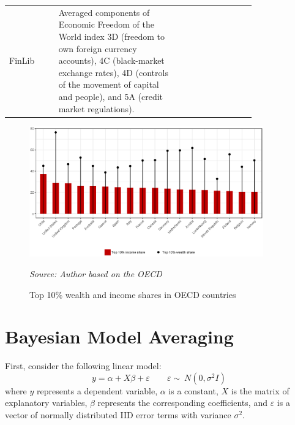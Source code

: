\begin{refsection}
\begin{subappendices}
\begin{center}
\begin{longtable}{l p{0.50\linewidth} p{0.3\linewidth}}
      FinLib & Averaged components of Economic Freedom of the World index 3D (freedom to own foreign currency accounts), 4C (black-market exchange rates), 4D (controls of the movement of capital and people), and 5A (credit market regulations). & \href{https://www.fraserinstitute.org/economic-freedom/dataset}{\textcite{gwartney2017}} \\
    
    \end{longtable}
    \end{center}
    
    \begin{figure}[ht!]
        \caption{Top 10\% wealth and income shares in \ac{OECD} countries}
        \centering
        \includegraphics[width=0.9\textwidth]{figures/ch3/wealthincome_comp_oecd.eps}
        \label{ch3fig:wealthincome_comp_oecd}
        \begin{minipage}{0.8\textwidth}
          \footnotesize
          \emph{Source: Author based on the \ac{OECD}}
          \end{minipage}
    \end{figure}
    
    \newpage
    \section{Bayesian Model Averaging}
    \label{ch3sec:app_bma}
    First, consider the following linear model:
    \begin{equation}\label{ch3eq:OLS}
    y = \alpha + X\beta+ \varepsilon \qquad \varepsilon  \sim\ N(0, \sigma^{2}I)
    \end{equation}
    where $y$ represents a dependent variable, $\alpha$ is a constant, $X$ is the matrix of explanatory variables, $\beta$ represents the corresponding coefficients, and $\varepsilon$ is a vector of normally distributed \ac{IID} error terms with variance $\sigma^{2}$. 
    

\end{subappendices}
\end{refsection}
